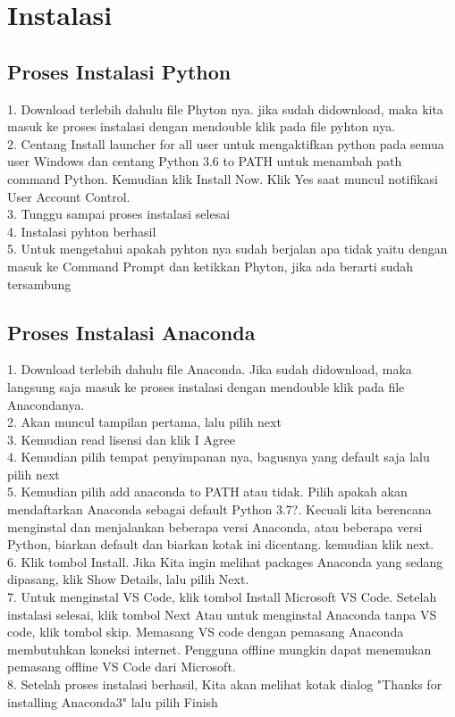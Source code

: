 \documentclass[lipt]{Article}
\begin{document}
\chapter{Instalasi}
\section{Proses Instalasi Python}
1. Download terlebih dahulu file Phyton nya. jika sudah didownload, maka kita masuk ke proses instalasi dengan mendouble klik pada file pyhton nya.\\
2. Centang Install launcher for all user untuk mengaktifkan python pada semua user Windows dan centang Python 3.6 to PATH untuk menambah path command Python. Kemudian klik Install Now. Klik Yes saat muncul notifikasi User Account Control. \\
3. Tunggu sampai proses instalasi selesai\\
4. Instalasi pyhton berhasil\\
5. Untuk mengetahui apakah pyhton nya sudah berjalan apa tidak yaitu dengan masuk ke Command Prompt dan ketikkan Phyton, jika ada berarti sudah tersambung\\

\section{Proses Instalasi Anaconda}
1. Download terlebih dahulu file Anaconda. Jika sudah didownload, maka langsung saja masuk ke proses instalasi dengan mendouble klik pada file Anacondanya.\\
2. Akan muncul tampilan pertama, lalu pilih next\\
3. Kemudian read lisensi dan klik I Agree\\
4. Kemudian pilih tempat penyimpanan nya, bagusnya yang default saja lalu pilih next\\
5. Kemudian pilih add anaconda to PATH atau tidak. Pilih apakah akan mendaftarkan Anaconda sebagai default Python 3.7?. Kecuali kita berencana menginstal dan menjalankan beberapa versi Anaconda, atau beberapa versi Python, biarkan default dan biarkan kotak ini dicentang. kemudian klik next.\\
6. Klik tombol Install. Jika Kita ingin melihat packages Anaconda yang sedang dipasang, klik Show Details, lalu pilih Next.\\
7. Untuk menginstal VS Code, klik tombol Install Microsoft VS Code. Setelah instalasi selesai, klik tombol Next Atau untuk menginstal Anaconda tanpa VS code, klik tombol skip. Memasang VS code dengan pemasang Anaconda membutuhkan koneksi internet. Pengguna offline mungkin dapat menemukan pemasang offline VS Code dari Microsoft.\\
8. Setelah proses instalasi berhasil, Kita akan melihat kotak dialog "Thanks for installing Anaconda3" lalu pilih Finish\\
\end{document}
